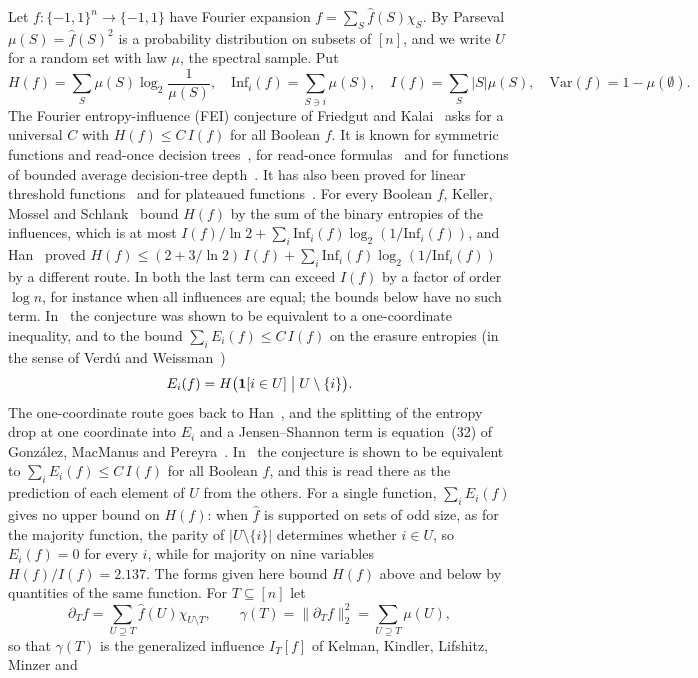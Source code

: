\documentclass[11pt]{amsart}
\theoremstyle{remark}
\newcommand{\Inf}{\mathrm{Inf}}
\newcommand{\Var}{\mathrm{Var}}
\begin{document}
Let $f:\{-1,1\}^n\to\{-1,1\}$ have Fourier expansion $f=\sum_S\hat f(S)\chi_S$. By Parseval $\mu(S)=\hat f(S)^2$ is a
probability distribution on subsets of $[n]$, and we write $U$ for a random set with law $\mu$, the spectral sample. Put
\[
H(f)=\sum_S\mu(S)\log_2\frac1{\mu(S)},\quad \Inf_i(f)=\sum_{S\ni i}\mu(S),\quad I(f)=\sum_S|S|\mu(S),\quad
\Var(f)=1-\mu(\emptyset).
\]
The Fourier entropy-influence (FEI) conjecture of Friedgut and Kalai~\cite{FK96} asks for a universal $C$ with
$H(f)\le C\,I(f)$ for all Boolean $f$. It is known for symmetric functions and read-once decision
trees~\cite{OWZ11}, for read-once formulas~\cite{OT13,CKLS} and for functions of bounded average decision-tree
depth~\cite{WWW}. It has also been proved for linear threshold functions~\cite{Shm2} and for plateaued functions~\cite{Pot26}. For every
Boolean $f$, Keller, Mossel and Schlank~\cite[Claim~4.1]{KMS} bound $H(f)$ by the sum of the binary entropies of the
influences, which is at most $I(f)/\ln 2+\sum_i\Inf_i(f)\log_2(1/\Inf_i(f))$, and Han~\cite{Han} proved
$H(f)\le(2+3/\ln 2)\,I(f)+\sum_i\Inf_i(f)\log_2(1/\Inf_i(f))$ by a different route. In both the last term can exceed
$I(f)$ by a factor of order $\log n$, for instance when all influences are equal; the bounds below have no such
term.
In~\cite{Shm1} the conjecture was shown to be equivalent to a one-coordinate inequality, and to the bound
$\sum_iE_i(f)\le C\,I(f)$ on the erasure entropies (in the sense of Verd\'u and Weissman~\cite{VW08})
\[
E_i(f)=H\bigl(\mathbf 1[i\in U]\bigm| U\setminus\{i\}\bigr).
\]
The one-coordinate route goes back to Han~\cite[Remark~3.2]{Han}, and the splitting of the entropy drop at one
coordinate into $E_i$ and a Jensen--Shannon term is equation~(32) of Gonz\'alez, MacManus and Pereyra~\cite{GMP}.
In~\cite[Corollary~5]{Shm1} the conjecture is shown to be equivalent to $\sum_iE_i(f)\le C\,I(f)$ for all Boolean
$f$, and this is read there as the prediction of each element of $U$ from the others. For a single function,
$\sum_iE_i(f)$ gives no upper bound on $H(f)$: when $\hat f$ is supported on sets of odd size, as for the majority
function, the parity of $|U\setminus\{i\}|$ determines whether $i\in U$, so $E_i(f)=0$ for every $i$, while for
majority on nine variables $H(f)/I(f)=2.137$. The forms given here bound $H(f)$ above and below by quantities of the
same function. For $T\subseteq[n]$ let
\[
\partial_T f=\sum_{U\supseteq T}\hat f(U)\chi_{U\setminus T},\qquad \gamma(T)=\|\partial_Tf\|_2^2=\sum_{U\supseteq T}\mu(U),
\]
so that $\gamma(T)$ is the generalized influence $I_T[f]$ of Kelman, Kindler, Lifshitz, Minzer and
\end{document}
